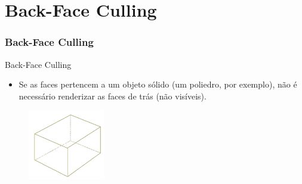 \documentclass{beamer}
\begin{document}
\section{Back-Face Culling}
\begin{frame}
\frametitle{Back-Face Culling}

		\begin{block}{Back-Face Culling}
			\begin{itemize}
				\item Se as faces pertencem a um objeto sólido (um poliedro, por exemplo), não é necessário renderizar as faces de trás (não visíveis).
			\end{itemize} 
		\end{block}
		
		\begin{figure}[!h]
			\begin{center}
				\includegraphics[width=0.3\textwidth]{Figures/Cub}
			\end{center}
		\end{figure}
		
\end{frame}
\end{document}
